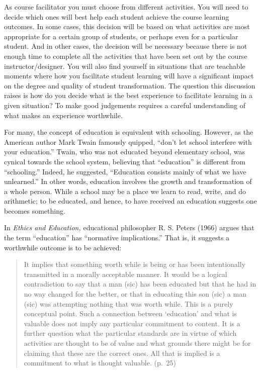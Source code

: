 \documentclass[
]{book}
\begin{document}
As course facilitator you must choose from different activities. You will need to decide which ones will best help each student achieve the course learning outcomes. In some cases, this decision will be based on what activities are most appropriate for a certain group of students, or perhaps even for a particular student. And in other cases, the decision will be necessary because there is not enough time to complete all the activities that have been set out by the course instructor/designer. You will also find yourself in situations that are teachable moments where how you facilitate student learning will have a significant impact on the degree and quality of student transformation. The question this discussion raises is how do you decide what is the best experience to facilitate learning in a given situation? To make good judgements requires a careful understanding of what makes an experience worthwhile.

For many, the concept of education is equivalent with schooling. However, as the American author Mark Twain famously quipped, ``don't let school interfere with your education.'' Twain, who was not educated beyond elementary school, was cynical towards the school system, believing that ``education'' is different from ``schooling.'' Indeed, he suggested, ``Education consists mainly of what we have unlearned.'' In other words, education involves the growth and transformation of a whole person. While a school may be a place we learn to read, write, and do arithmetic; to be educated, and hence, to have received an education suggests one becomes something.

In \emph{Ethics and Education,} educational philosopher R. S. Peters (1966) argues that the term ``education'' has ``normative implications.'' That is, it suggests a worthwhile outcome is to be achieved:

\begin{quote}
It implies that something worth while is being or has been intentionally transmitted in a morally acceptable manner. It would be a logical contradiction to say that a man (sic) has been educated but that he had in no way changed for the better, or that in educating this son (sic) a man (sic) was attempting nothing that was worth while. This is a purely conceptual point. Such a connection between `education' and what is valuable does not imply any particular commitment to content. It is a further question what the particular standards are in virtue of which activities are thought to be of value and what grounds there might be for claiming that these are the correct ones. All that is implied is a commitment to what is thought valuable. (p.~25)
\end{quote}
\end{document}
